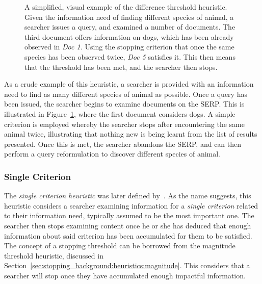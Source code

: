 \begin{figure}[t!]
    \centering
    \caption[Difference threshold heuristic]{A simplified, visual example of the difference threshold heuristic. Given the information need of finding different species of animal, a searcher issues a query, and examined a number of documents. The third document offers information on dogs, which has been already observed in \emph{Doc 1.} Using the stopping criterion that once the same species has been observed twice, \emph{Doc 5} satisfies it. This then means that the threshold has been met, and the searcher then stops.}
    \label{fig:difference_heuristic}
\end{figure}

As a crude example of this heuristic, a searcher is provided with an information need to find as many different species of animal as possible. Once a query has been issued, the searcher begins to examine documents on the SERP. This is illustrated in Figure~\ref{fig:difference_heuristic}, where the first document considers dogs. A simple criterion is employed whereby the searcher stops after encountering the same animal twice, illustrating that nothing new is being learnt from the list of results presented. Once this is met, the searcher abandons the SERP, and can then perform a query reformulation to discover different species of animal.

\subsubsection{Single Criterion}\label{sec:stopping_background:heuristics:single}
The \emph{single criterion heuristic} was later defined by~\cite{browne2005stopping_rules}. As the name suggests, this heuristic considers a searcher examining information for a \emph{single criterion} related to their information need, typically assumed to be the most important one. The searcher then stops examining content once he or she has deduced that enough information about said criterion has been accumulated for them to be satisfied. The concept of a stopping threshold can be borrowed from the magnitude threshold heuristic, discussed in Section~\ref{sec:stopping_background:heuristics:magnitude}. This considers that a searcher will stop once they have accumulated enough impactful information.

